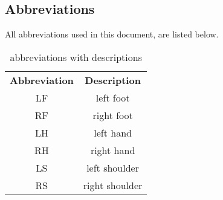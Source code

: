 \subsection{Abbreviations}
All abbreviations used in this document, are listed below.
\begin{table}[H]
\centering
\begin{tabular}{cc}
  \toprule
  \textbf{Abbreviation} & \textbf{Description}\\
  \cmidrule(lr){1-1}\cmidrule(lr){2-2}
  LF & left foot\\
  RF & right foot\\
  LH & left hand\\
  RH & right hand\\
  LS & left shoulder\\
  RS & right shoulder\\
  \bottomrule
\end{tabular}
\label{abbreviations}
\caption{abbreviations with descriptions}
\end{table}
